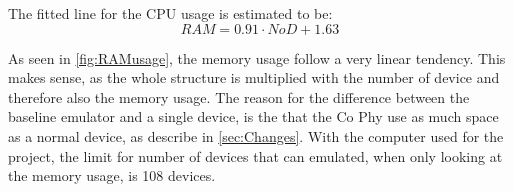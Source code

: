 The fitted line for the CPU usage is estimated to be:
\begin{equation}
RAM = 0.91 \cdot NoD + 1.63
\end{equation}


As seen in \autoref{fig:RAMusage}, the memory usage follow a very linear tendency. This makes sense, as the whole structure is multiplied with the number of device and therefore also the memory usage. The reason for the difference between the baseline emulator and a single device, is the that the Co Phy use as much space as a normal device, as describe in \autoref{sec:Changes}. With the computer used for the project, the limit for number of devices that can emulated, when only looking at the memory usage, is 108 devices.



